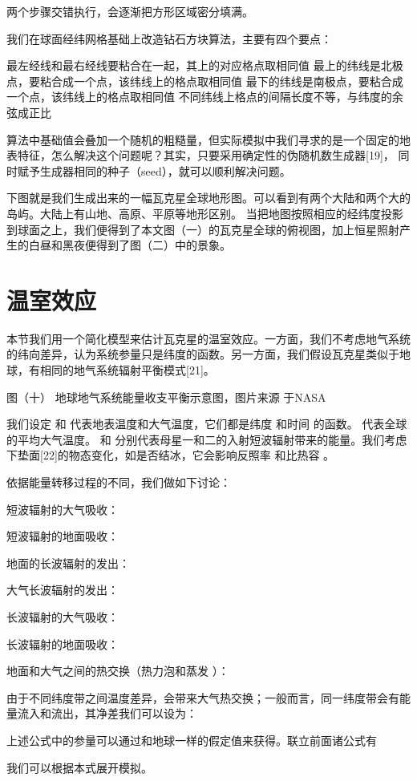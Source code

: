 \documentclass[a4paper,10.5pt]{book}
\begin{document}
两个步骤交错执行，会逐渐把方形区域密分填满。

我们在球面经纬网格基础上改造钻石方块算法，主要有四个要点：

最左经线和最右经线要粘合在一起，其上的对应格点取相同值
最上的纬线是北极点，要粘合成一个点，该纬线上的格点取相同值
最下的纬线是南极点，要粘合成一个点，该纬线上的格点取相同值
不同纬线上格点的间隔长度不等，与纬度的余弦成正比

算法中基础值会叠加一个随机的粗糙量，但实际模拟中我们寻求的是一个固定的地表特征，怎么解决这个问题呢？其实，只要采用确定性的伪随机数生成器[19]，
同时赋予生成器相同的种子（seed），就可以顺利解决问题。

下图就是我们生成出来的一幅瓦克星全球地形图。可以看到有两个大陆和两个大的岛屿。大陆上有山地、高原、平原等地形区别。
当把地图按照相应的经纬度投影到球面之上，我们便得到了本文图（一）的瓦克星全球的俯视图，加上恒星照射产生的白昼和黑夜便得到了图（二）中的景象。

\section{温室效应}

本节我们用一个简化模型来估计瓦克星的温室效应。一方面，我们不考虑地气系统的纬向差异，认为系统参量只是纬度的函数。另一方面，我们假设瓦克星类似于地球，有相同的地气系统辐射平衡模式[21]。


图（十）
地球地气系统能量收支平衡示意图，图片来源 于NASA

我们设定  和  代表地表温度和大气温度，它们都是纬度  和时间  的函数。   代表全球的平均大气温度。 和   分别代表母星一和二的入射短波辐射带来的能量。我们考虑下垫面[22]的物态变化，如是否结冰，它会影响反照率  和比热容  。

依据能量转移过程的不同，我们做如下讨论：

短波辐射的大气吸收：

短波辐射的地面吸收：

地面的长波辐射的发出：

大气长波辐射的发出：

长波辐射的大气吸收：

长波辐射的地面吸收：

地面和大气之间的热交换（热力泡和蒸发 ）：

由于不同纬度带之间温度差异，会带来大气热交换；一般而言，同一纬度带会有能量流入和流出，其净差我们可以设为：

上述公式中的参量可以通过和地球一样的假定值来获得。联立前面诸公式有

我们可以根据本式展开模拟。
\end{document}
